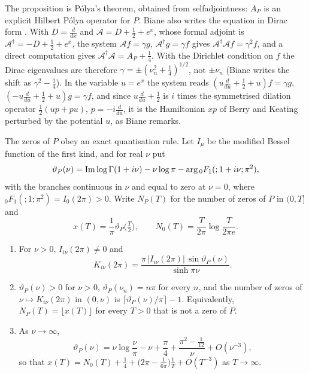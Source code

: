 The proposition is P\'olya's theorem, obtained from selfadjointness: $A_P$ is an explicit Hilbert P\'olya operator for $P$. Biane also writes the equation in Dirac form \cite[Section 3.4]{Biane09}. With $D=\frac d{dx}$ and $\mathcal A=D+\frac12+e^x$, whose formal adjoint is $\mathcal A^\dagger=-D+\frac12+e^x$, the system $\mathcal Af=\gamma g$, $\mathcal A^\dagger g=\gamma f$ gives $\mathcal A^\dagger\mathcal Af=\gamma^2f$, and a direct computation gives $\mathcal A^\dagger\mathcal A=A_P+\frac14$. With the Dirichlet condition on $f$ the Dirac eigenvalues are therefore $\gamma=\pm(\nu_n^2+\frac14)^{1/2}$, not $\pm\nu_n$ (Biane writes the shift as $\gamma^2-\frac14$). In the variable $u=e^x$ the system reads $(u\frac d{du}+\frac12+u)f=\gamma g$, $(-u\frac d{du}+\frac12+u)g=\gamma f$, and since $u\frac d{du}+\frac12$ is $i$ times the symmetrised dilation operator $\frac12(up+pu)$, $p=-i\frac d{du}$, it is the Hamiltonian $xp$ of Berry and Keating \cite{BerryKeating99} perturbed by the potential $u$, as Biane remarks.

The zeros of $P$ obey an exact quantisation rule. Let $I_\mu$ be the modified Bessel function of the first kind, and for real $\nu$ put
\begin{equation}\label{eq:biane:phase}
\vartheta_P(\nu)=\operatorname{Im}\log\Gamma(1+i\nu)-\nu\log\pi-\arg{}_0F_1(;1+i\nu;\pi^2),
\end{equation}
with the branches continuous in $\nu$ and equal to zero at $\nu=0$, where ${}_0F_1(;1;\pi^2)=I_0(2\pi)>0$. Write $N_P(T)$ for the number of zeros of $P$ in $(0,T]$ and
\[
x(T)=\frac1\pi\vartheta_P\big(\tfrac T2\big),\qquad N_0(T)=\frac T{2\pi}\log\frac T{2\pi e}.
\]

\begin{proposition}\label{prop:biane:phase}
\begin{enumerate}
\item[(i)] For $\nu>0$, $I_{i\nu}(2\pi)\ne0$ and
\[
K_{i\nu}(2\pi)=\frac{\pi\,|I_{i\nu}(2\pi)|\,\sin\vartheta_P(\nu)}{\sinh\pi\nu}.
\]
\item[(ii)] $\vartheta_P(\nu)>0$ for $\nu>0$, $\vartheta_P(\nu_n)=n\pi$ for every $n$, and the number of zeros of $\nu\mapsto K_{i\nu}(2\pi)$ in $(0,\nu)$ is $\lceil\vartheta_P(\nu)/\pi\rceil-1$. Equivalently, $N_P(T)=\lfloor x(T)\rfloor$ for every $T>0$ that is not a zero of $P$.
\item[(iii)] As $\nu\to\infty$,
\[
\vartheta_P(\nu)=\nu\log\frac\nu\pi-\nu+\frac\pi4+\frac{\pi^2-\frac1{12}}\nu+O(\nu^{-3}),
\]
so that $x(T)=N_0(T)+\frac14+\big(2\pi-\frac1{6\pi}\big)\frac1T+O(T^{-3})$ as $T\to\infty$.
\end{enumerate}
\end{proposition}

